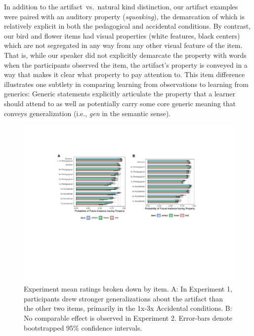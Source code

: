 \documentclass[10pt,letterpaper]{article}
\begin{document}
In addition to the artifact~vs.~natural kind distinction, our artifact examples were paired with an auditory property (\emph{squeaking}), the demarcation of which is relatively explicit in both the pedagogical and accidental conditions. 
By contrast, our bird and flower items had visual properties (white features, black centers) which are not segregated in any way from any other visual feature of the item.
That is, while our speaker did not explicitly demarcate the property with words when the participants observed the item, the artifact's property is conveyed in a way that makes it clear what property to pay attention to. 
This item difference illustrates one subtlety in comparing learning from observations to learning from generics: Generic statements explicitly articulate the property that a learner should attend to as well as potentially carry some core generic meaning that conveys generalization (i.e., \emph{gen} in the semantic sense).


\begin{figure}[t]
\begin{center}
\includegraphics[width=\linewidth]{figs/genex_expts_itembars.pdf}
\end{center}
\caption{Experiment mean ratings broken down by item. A: In Experiment 1, participants drew stronger generalizations about the artifact than the other two items, primarily in the 1x-3x Accidental conditions. B: No comparable effect is observed in Experiment 2. Error-bars denote bootstrapped 95\% confidence intervals.}
\label{fig:results1item}
\end{figure}
\end{document}
